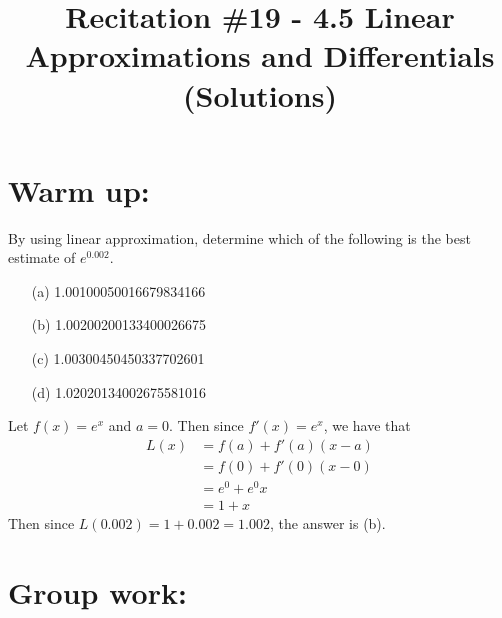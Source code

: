 \documentclass[nooutcomes]{ximera}
\title{Recitation \#19 - 4.5 Linear Approximations and Differentials (Solutions)}
\begin{document}
\begin{abstract}		\end{abstract}
\maketitle

\section*{Warm up:} 
By using linear approximation, determine which of the following is the best estimate of $e^{0.002}$.
	\begin{enumerate}
	\item[(a)]  1.00100050016679834166
	\item[(b)]  1.00200200133400026675
	\item[(c)]  1.00300450450337702601
	\item[(d)]  1.02020134002675581016
	\end{enumerate}
	
		\begin{freeResponse}
		Let $f(x) = e^x$ and $a=0$.  Then since $f'(x) = e^x$, we have that
		\begin{align*}
		L(x) &= f(a) + f'(a)(x-a) \\
		&=  f(0) + f'(0)(x-0) \\
		&= e^0 + e^0x \\
		&= 1 + x
		\end{align*}
		Then since $L(0.002) = 1 + 0.002 = 1.002$, the answer is (b).
		\end{freeResponse}	
		
		
		

	
	
	
	
	

\section*{Group work:}
\end{document}

